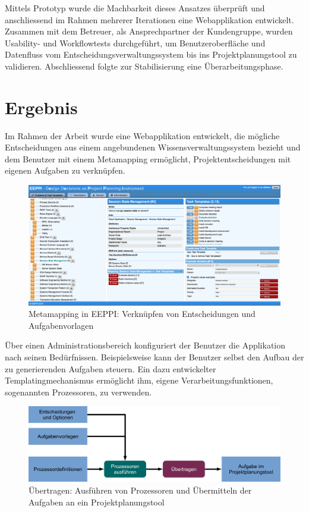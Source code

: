 	Mittels Prototyp wurde die Machbarkeit dieses Ansatzes überprüft 
	und anschliessend im Rahmen mehrerer Iterationen eine Webapplikation entwickelt. 
	Zusammen mit dem Betreuer, als Ansprechpartner der Kundengruppe, wurden Usability- und Workflowtests durchgeführt, 
	um Benutzeroberfläche und Datenfluss vom Entscheidungsverwaltungssystem bis ins Projektplanungstool zu validieren. 
	Abschliessend folgte zur Stabilisierung eine Überarbeitungsphase.
	
	
	\section{Ergebnis}
		
	Im Rahmen der Arbeit wurde eine Webapplikation entwickelt, 
	die mögliche Entscheidungen aus einem angebundenen Wissensverwaltungssystem bezieht 
	und dem Benutzer mit einem Metamapping ermöglicht,
	Projektentscheidungen mit eigenen Aufgaben zu verknüpfen. 
	
	\begin{figure}[H]
		\includegraphics[width=\textwidth]{introduction/img/eeppiDecisionsAndTaskTemplates.png}
		\centering
		\caption{Metamapping in EEPPI: Verknüpfen von Entscheidungen und Aufgabenvorlagen}
		\label{fig:metamapping}
	\end{figure}	
	
	Über einen Administrationsbereich konfiguriert der Benutzer die Applikation nach seinen Bedürfnissen. 
	Beispielsweise kann der Benutzer selbst den Aufbau der zu generierenden Aufgaben steuern. 
	Ein dazu entwickelter Templatingmechanismus ermöglicht ihm, eigene Verarbeitungsfunktionen, sogenannten Prozessoren, zu verwenden. 
	
	\begin{figure}[H]
		\includegraphics[width=\textwidth]{introduction/img/simpleProcessWorkflow.jpg}
		\centering
		\caption{Übertragen: Ausführen von Prozessoren und Übermitteln der Aufgaben an ein Projektplanungstool}
		\label{fig:metamapping}
	\end{figure}
	
